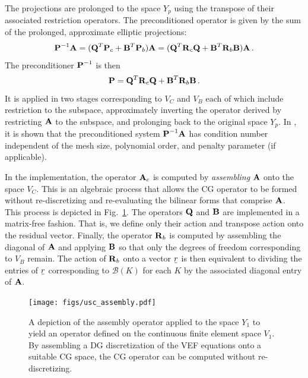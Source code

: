 \documentclass[../doc.tex]{subfiles}
\begin{document}
The projections are prolonged to the space $Y_p$ using the transpose of their associated restriction operators. 
The preconditioned operator is given by the sum of the prolonged, approximate elliptic projections: 
	\begin{equation}
		\boldsymbol{\mathrm{P}}^{-1}\boldsymbol{\mathrm{A}} = (\boldsymbol{\mathrm{Q}}^T \boldsymbol{\mathrm{P}}_c + \boldsymbol{\mathrm{B}}^T\boldsymbol{\mathrm{P}}_b)\boldsymbol{\mathrm{A}} = (\boldsymbol{\mathrm{Q}}^T\boldsymbol{\mathrm{R}}_c \boldsymbol{\mathrm{Q}} + \boldsymbol{\mathrm{B}}^T \boldsymbol{\mathrm{R}}_b \boldsymbol{\mathrm{B}})\boldsymbol{\mathrm{A}} \,. 
	\end{equation}
The preconditioner $\boldsymbol{\mathrm{P}}^{-1}$ is then 
	\begin{equation}
		\boldsymbol{\mathrm{P}} = \boldsymbol{\mathrm{Q}}^T\boldsymbol{\mathrm{R}}_c \boldsymbol{\mathrm{Q}} + \boldsymbol{\mathrm{B}}^T \boldsymbol{\mathrm{R}}_b \boldsymbol{\mathrm{B}} \,. 
	\end{equation}
It is applied in two stages corresponding to $V_C$ and $V_B$ each of which include restriction to the subspace, approximately inverting the operator derived by restricting $\boldsymbol{\mathrm{A}}$ to the subspace, and prolonging back to the original space $Y_p$. 
In \textcite{Pazner2021}, it is shown that the preconditioned system $\boldsymbol{\mathrm{P}}^{-1}\boldsymbol{\mathrm{A}}$ has condition number independent of the mesh size, polynomial order, and penalty parameter (if applicable). 

In the implementation, the operator $\boldsymbol{\mathrm{A}}_c$ is computed by \emph{assembling} $\boldsymbol{\mathrm{A}}$ onto the space $V_C$. This is an algebraic process that allows the CG operator to be formed without re-discretizing and re-evaluating the bilinear forms that comprise $\boldsymbol{\mathrm{A}}$. This process is depicted in Fig.~\ref{dgvef:usc_assembly}. The operators $\boldsymbol{\mathrm{Q}}$ and $\boldsymbol{\mathrm{B}}$ are implemented in a matrix-free fashion. That is, we define only their action and transpose action onto the residual vector. Finally, the operator $\boldsymbol{\mathrm{R}}_b$ is computed by assembling the diagonal of $\boldsymbol{\mathrm{A}}$ and applying $\boldsymbol{\mathrm{B}}$ so that only the degrees of freedom corresponding to $V_B$ remain. The action of $\boldsymbol{\mathrm{R}}_b$ onto a vector $\ubar{r}$ is then equivalent to dividing the entries of $\ubar{r}$ corresponding to $\mathcal{B}(K)$ for each $K$ by the associated diagonal entry of $\boldsymbol{\mathrm{A}}$.
\begin{figure}
\centering
\texttt{[image: figs/usc\_assembly.pdf]}
\caption{A depiction of the assembly operator applied to the space $Y_1$ to yield an operator defined on the continuous finite element space $V_1$. By assembling a DG discretization of the VEF equations onto a suitable CG space, the CG operator can be computed without re-discretizing.}
\label{dgvef:usc_assembly}
\end{figure}
\end{document}
